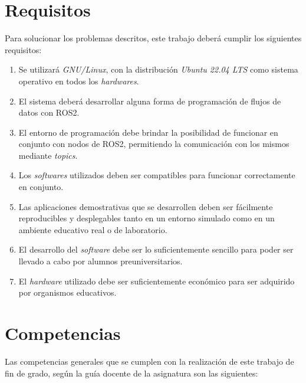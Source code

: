 
\section{Requisitos}
\label{sec:requisitos}

Para solucionar los problemas descritos, este trabajo deberá cumplir los
siguientes requisitos:

\begin{enumerate}
    \item{Se utilizará \textit{GNU/Linux}, con la distribución
        \textit{Ubuntu 22.04 LTS} como sistema operativo en todos los
        \textit{hardwares}.}
    \item{El sistema deberá desarrollar alguna forma de programación de flujos
        de datos con ROS2.}
    \item{El entorno de programación debe brindar la posibilidad de funcionar en
        conjunto con nodos de ROS2, permitiendo la comunicación con los mismos
        mediante \textit{topics}.}
    \item{Los \textit{softwares} utilizados deben ser compatibles para funcionar
        correctamente en conjunto.}
    \item{Las aplicaciones demostrativas que se desarrollen deben ser fácilmente
        reproducibles y desplegables tanto en un entorno simulado como en un
        ambiente educativo real o de laboratorio.}
    \item{El desarrollo del \textit{software} debe ser lo suficientemente
        sencillo para poder ser llevado a cabo por alumnos preuniversitarios.}
    \item{El \textit{hardware} utilizado debe ser suficientemente económico para
        ser adquirido por organismos educativos.}
\end{enumerate}



\section{Competencias}
\label{sec:requisitos}

Las competencias generales que se cumplen con la realización de este trabajo de
fin de grado, según la guía docente de la asignatura son las siguientes:

